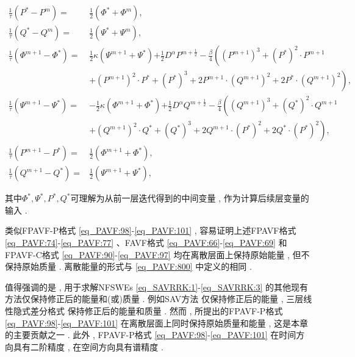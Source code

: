 \begin{enumerate}[$\bullet$]
\begin{align}
\frac{1}{\tau}\left(P^{*}-P^{m}\right)=&\frac{1}{2}(\varPhi^{*}+\varPhi^{m}) , \label{eq_PAVF:92}\\
\frac{1}{\tau}\left(Q^{*}-Q^{m}\right)=&\frac{1}{2}(\Psi^{*}+\Psi^{m}) , \label{eq_PAVF:93}\\
\frac{1}{\tau}\left(\varPhi^{m+1}-\varPhi^{*}\right)=&\frac{1}{2}\kappa (\Psi^{m+1}+\Psi^{*}){+\frac{1}{2}D^{\alpha} P^{m+\frac{1}{2}}}-\frac{\beta}{4}\left((P^{m+1})^3+(P^{*})^{2}\cdot P^{m+1}\right . \nonumber\\
		&\left . +(P^{m+1})^{2}\cdot P^{*}+ (P^{*})^{3}+2 P^{m+1}\cdot (Q^{m+1})^{2}+2 P^{*}\cdot (Q^{m+1})^{2}\right) , \label{eq_PAVF:94}\\
\frac{1}{\tau}\left(\Psi^{m+1}-\Psi^{*}\right)=&-\frac{1}{2}\kappa (\varPhi^{m+1}+\varPhi^{*}){+\frac{1}{2}D^{\alpha} Q^{m+\frac{1}{2}}}-\frac{\beta}{4}\left((Q^{m+1})^3+(Q^{*})^{2}\cdot Q^{m+1}\right . \nonumber\\
		&\left . +(Q^{m+1})^{2}\cdot Q^{*}+ (Q^{*})^{3}+2 Q^{m+1}\cdot (P^{*})^{2}+2 Q^{*}\cdot (P^{*})^{2}\right) , \label{eq_PAVF:95}\\
\frac{1}{\tau}\left(P^{m+1}-P^{*}\right)=&\frac{1}{2}(\varPhi^{m+1}+\varPhi^{*}) , \label{eq_PAVF:96}\\
\frac{1}{\tau}\left(Q^{m+1}-Q^{*}\right)=&\frac{1}{2}(\Psi^{m+1}+\Psi^{*}) , \label{eq_PAVF:97}
\end{align}
\end{enumerate}
\newpage
\noindent 其中$\Phi^* , \Psi^* , P^* , Q^*$可理解为从前一层迭代得到的中间变量 , 作为计算后续层变量的输入 . 

\begin{remark}\label{rk_PAVF:1}
类似FPAVF-P格式 \eqref{eq_PAVF:98}-\eqref{eq_PAVF:101} , 容易证明上述FPAVF格式 \eqref{eq_PAVF:74}-\eqref{eq_PAVF:77} 、FAVF格式 \eqref{eq_PAVF:66}-\eqref{eq_PAVF:69} 和FPAVF-C格式 \eqref{eq_PAVF:90}-\eqref{eq_PAVF:97} 均在离散层面上保持原始能量 , 但不保持原始质量 . 离散能量的形式与 \eqref{eq_PAVF:800} 中定义的相同 . 
\end{remark}

\begin{remark}\label{rk_PAVF:2}
值得强调的是 , 用于求解NFSWEs \eqref{eq_SAVRRK:1}-\eqref{eq_SAVRRK:3} 的其他现有方法仅保持修正后的能量和(或)质量 . 
例如SAV方法 \cite{chengConvergenceEnergyconservingScheme2022} 仅保持修正后的能量 , 
三层线性隐式差分格式 \cite{ranLinearlyImplicitConservative2016} 保持修正后的能量和质量 . 
然而 , 所提出的FPAVF-P格式 \eqref{eq_PAVF:98}-\eqref{eq_PAVF:101} 在离散层面上同时保持原始质量和能量 , 这是本章的主要贡献之一 . 
此外 , FPAVF-P格式 \eqref{eq_PAVF:98}-\eqref{eq_PAVF:101} 在时间方向具有二阶精度 , 在空间方向具有谱精度 . 
\end{remark}

